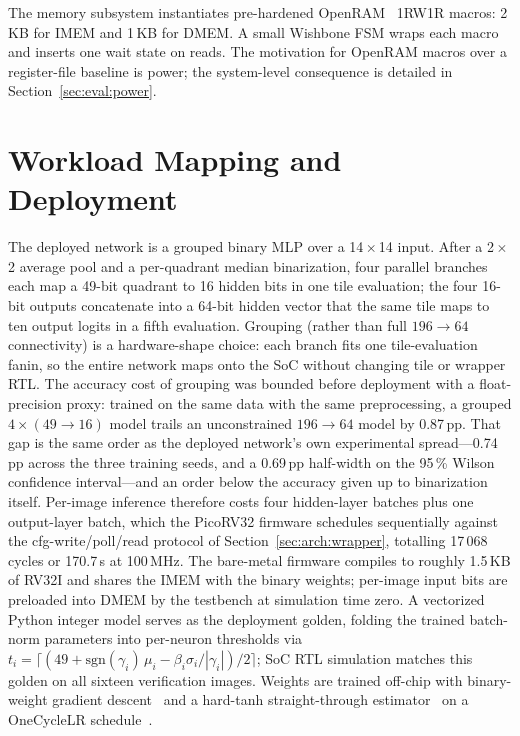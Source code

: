 \documentclass[conference]{IEEEtran}
\begin{document}
The memory subsystem instantiates pre-hardened OpenRAM~\cite{guthaus2016openram}
1RW1R macros: 2\,KB for IMEM and 1\,KB for DMEM. A small Wishbone
FSM wraps each macro and inserts one wait state on reads. The
motivation for OpenRAM macros over a register-file baseline is
power; the system-level consequence is detailed in
Section~\ref{sec:eval:power}.

\section{Workload Mapping and Deployment}
\label{sec:workload}

The deployed network is a grouped binary MLP over a
14\,\(\times\)\,14 input. After a 2\,\(\times\)\,2 average pool and a
per-quadrant median binarization, four parallel branches each map a
49-bit quadrant to 16 hidden bits in one tile evaluation; the four
16-bit outputs concatenate into a 64-bit hidden vector that the same
tile maps to ten output logits in a fifth evaluation. Grouping
(rather than full $196 \to 64$ connectivity) is a hardware-shape
choice: each branch fits one tile-evaluation fanin, so the entire
network maps onto the SoC without changing tile or wrapper RTL.
The accuracy cost of grouping was bounded before deployment with a
float-precision proxy: trained on the same data with the same
preprocessing, a grouped $4 \times (49 \to 16)$ model trails an
unconstrained $196 \to 64$ model by 0.87\,pp. That gap is the same
order as the deployed network's own experimental spread---0.74\,pp
across the three training seeds, and a 0.69\,pp half-width on the
95\,\% Wilson confidence interval---and an order below the accuracy
given up to binarization itself.
Per-image inference therefore costs four hidden-layer batches plus
one output-layer batch, which the PicoRV32 firmware schedules
sequentially against the cfg-write/poll/read protocol of
Section~\ref{sec:arch:wrapper}, totalling 17\,068 cycles or
170.7\,\textmu s at 100\,MHz. The bare-metal firmware compiles to
roughly 1.5\,KB of RV32I and shares the IMEM with the binary weights;
per-image input bits are preloaded into DMEM by the testbench at
simulation time zero. A vectorized Python integer model serves as
the deployment golden, folding the trained batch-norm parameters into
per-neuron thresholds via
$t_i = \lceil (49 + \mathrm{sgn}(\gamma_i)\,\mu_i - \beta_i\sigma_i/|\gamma_i|)/2 \rceil$;
SoC RTL simulation matches this golden on all sixteen verification
images. Weights are trained off-chip with
binary-weight gradient descent~\cite{courbariaux2015binaryconnect} and a hard-tanh
straight-through estimator~\cite{hubara2016bnn} on a OneCycleLR
schedule~\cite{smith2017superconvergence}.
\end{document}
